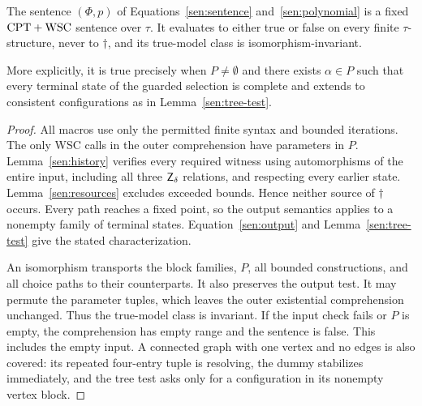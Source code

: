 \begin{proposition}\label{sen:all-input}
The sentence \((\Phi,p)\) of
Equations~\eqref{sen:sentence} and~\eqref{sen:polynomial} is a fixed
\(\mathrm{CPT}+\mathrm{WSC}\) sentence over \(\tau\). It evaluates to either true or
false on every finite \(\tau\)-structure, never to \(\dagger\), and its
true-model class is isomorphism-invariant.

More explicitly, it is true precisely when \(P\ne\emptyset\) and there
exists \(\alpha\in P\) such that every terminal state of the guarded
selection is complete and extends to consistent configurations as in
Lemma~\ref{sen:tree-test}.
\end{proposition}
\begin{proof}
All macros use only the permitted finite syntax and bounded iterations.
The only WSC calls in the outer comprehension have parameters in \(P\).
Lemma~\ref{sen:history} verifies every required witness using
automorphisms of the entire input, including all three
\(\mathsf Z_\delta\) relations, and respecting every earlier state.
Lemma~\ref{sen:resources} excludes exceeded bounds. Hence neither source
of \(\dagger\) occurs. Every path reaches a fixed point, so the output
semantics applies to a nonempty family of terminal states.
Equation~\eqref{sen:output} and Lemma~\ref{sen:tree-test} give the stated
characterization.

An isomorphism transports the block families, \(P\), all bounded
constructions, and all choice paths to their counterparts. It also
preserves the output test. It may permute the parameter tuples, which
leaves the outer existential comprehension unchanged. Thus the
true-model class is invariant. If the input check fails or \(P\) is
empty, the comprehension has empty range and the sentence is false.
This includes the empty input. A connected graph with one vertex and
no edges is also covered: its repeated four-entry tuple is resolving,
the dummy stabilizes immediately, and the tree test asks only for a
configuration in its nonempty vertex block.
\end{proof}
